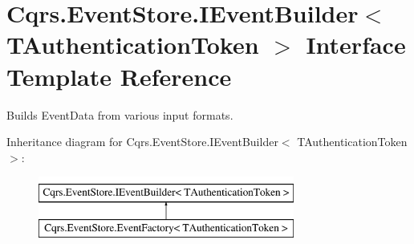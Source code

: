 \hypertarget{interfaceCqrs_1_1EventStore_1_1IEventBuilder}{}\section{Cqrs.\+Event\+Store.\+I\+Event\+Builder$<$ T\+Authentication\+Token $>$ Interface Template Reference}
\label{interfaceCqrs_1_1EventStore_1_1IEventBuilder}


Builds Event\+Data from various input formats.  


Inheritance diagram for Cqrs.\+Event\+Store.\+I\+Event\+Builder$<$ T\+Authentication\+Token $>$\+:\begin{figure}[H]
\begin{center}
\leavevmode
\includegraphics[height=2.000000cm]{interfaceCqrs_1_1EventStore_1_1IEventBuilder}
\end{center}
\end{figure}
